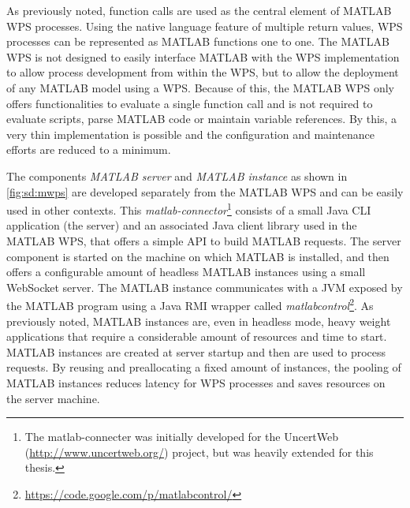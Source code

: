     As previously noted, function calls are used as the central element of MATLAB WPS processes. Using the native language feature of multiple return values, WPS processes can be represented as MATLAB functions one to one. The MATLAB WPS is not designed to easily interface MATLAB with the WPS implementation to allow process development from within the WPS, but to allow the deployment of any MATLAB model using a WPS. Because of this, the MATLAB WPS only offers functionalities to evaluate a single function call and is not required to evaluate scripts, parse MATLAB code or maintain variable references. By this, a very thin implementation is possible and the configuration and maintenance efforts are reduced to a minimum.

    The components \emph{MATLAB server} and \emph{MATLAB instance} as shown in \cref{fig:sd:mwps} are developed separately from the MATLAB WPS and can be easily used in other contexts. This \emph{matlab-connector}\footnote{The matlab-connecter was initially developed for the UncertWeb (\url{http://www.uncertweb.org/}) project, but was heavily extended for this thesis.} consists of a small Java CLI application (the server) and an associated Java client library used in the MATLAB WPS, that offers a simple \ac{API} to build MATLAB requests. The server component is started on the machine on which MATLAB is installed, and then offers a configurable amount of headless MATLAB instances using a small WebSocket server. The MATLAB instance communicates with a \ac{JVM} exposed by the MATLAB program using a Java \ac{RMI} wrapper called \emph{matlabcontrol}\footnote{\url{https://code.google.com/p/matlabcontrol/}}. As previously noted, MATLAB instances are, even in headless mode, heavy weight applications that require a considerable amount of resources and time to start. MATLAB instances are created at server startup and then are used to process requests. By reusing and preallocating a fixed amount of instances, the pooling of MATLAB instances reduces latency for WPS processes and saves resources on the server machine.

